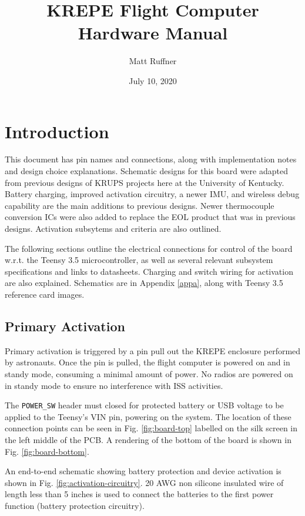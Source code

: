 \documentclass{article}
\title{KREPE Flight Computer Hardware Manual}
\author{Matt Ruffner}
\date{July 10, 2020}
\begin{document}
\maketitle
\tableofcontents
\newpage
\listoffigures
\listoftables
\newpage

\section{Introduction}

This document has pin names and connections, along with implementation notes and design choice explanations. Schematic designs for this board were adapted from previous designs of KRUPS projects here at the University of Kentucky. Battery charging, improved activation circuitry, a newer IMU, and wireless debug capability are the main additions to previous designs. Newer thermocouple conversion ICs were also added to replace the EOL product that was in previous designs. Activation subsytems and criteria are also outlined.

The following sections outline the electrical connections for control of the board w.r.t. the Teensy 3.5 microcontroller, as well as several relevant subsystem specifications and links to datasheets. Charging and switch wiring for activation are also explained. Schematics are in Appendix \ref{appa}, along with Teensy 3.5 reference card images.

\subsection{Primary Activation}
Primary activation is triggered by a pin pull out the KREPE enclosure performed by astronauts. Once the pin is pulled, the flight computer is powered on and in standy mode, consuming a minimal amount of power. No radios are powered on in standy mode to ensure no interference with ISS activities. 

The \texttt{POWER\_SW} header must closed for protected battery or USB voltage to be applied to the Teensy's VIN pin, powering on the system. The location of these connection points can be seen in Fig. \ref{fig:board-top} labelled on the silk screen in the left middle of the PCB. A rendering of the bottom of the board is shown in Fig. \ref{fig:board-bottom}.

An end-to-end schematic showing battery protection and device activation is shown in Fig. \ref{fig:activation-circuitry}. 20 AWG non silicone insulated wire of length less than 5 inches is used to connect the batteries to the first power function (battery protection circuitry).
\end{document}
